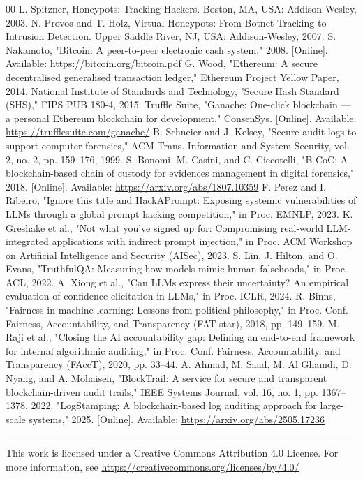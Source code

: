 \documentclass[journal,10pt,twocolumn]{IEEEtran}
\begin{document}

\begin{thebibliography}{00}
 L. Spitzner, Honeypots: Tracking Hackers. Boston, MA, USA: Addison-Wesley, 2003.
 N. Provos and T. Holz, Virtual Honeypots: From Botnet Tracking to Intrusion Detection. Upper Saddle River, NJ, USA: Addison-Wesley, 2007.
 S. Nakamoto, "Bitcoin: A peer-to-peer electronic cash system," 2008. [Online]. Available: \url{https://bitcoin.org/bitcoin.pdf}
 G. Wood, "Ethereum: A secure decentralised generalised transaction ledger," Ethereum Project Yellow Paper, 2014.
 National Institute of Standards and Technology, "Secure Hash Standard (SHS)," FIPS PUB 180-4, 2015.
 Truffle Suite, "Ganache: One-click blockchain --- a personal Ethereum blockchain for development," ConsenSys. [Online]. Available: \url{https://trufflesuite.com/ganache/}
 B. Schneier and J. Kelsey, "Secure audit logs to support computer forensics," ACM Trans. Information and System Security, vol. 2, no. 2, pp. 159--176, 1999.
 S. Bonomi, M. Casini, and C. Ciccotelli, "B-CoC: A blockchain-based chain of custody for evidences management in digital forensics," 2018. [Online]. Available: \url{https://arxiv.org/abs/1807.10359}
 F. Perez and I. Ribeiro, "Ignore this title and HackAPrompt: Exposing systemic vulnerabilities of LLMs through a global prompt hacking competition," in Proc. EMNLP, 2023.
 K. Greshake et al., "Not what you've signed up for: Compromising real-world LLM-integrated applications with indirect prompt injection," in Proc. ACM Workshop on Artificial Intelligence and Security (AISec), 2023.
 S. Lin, J. Hilton, and O. Evans, "TruthfulQA: Measuring how models mimic human falsehoods," in Proc. ACL, 2022.
 A. Xiong et al., "Can LLMs express their uncertainty? An empirical evaluation of confidence elicitation in LLMs," in Proc. ICLR, 2024.
 R. Binns, "Fairness in machine learning: Lessons from political philosophy," in Proc. Conf. Fairness, Accountability, and Transparency (FAT-star), 2018, pp. 149--159.
 M. Raji et al., "Closing the AI accountability gap: Defining an end-to-end framework for internal algorithmic auditing," in Proc. Conf. Fairness, Accountability, and Transparency (FAccT), 2020, pp. 33--44.
 A. Ahmad, M. Saad, M. Al Ghamdi, D. Nyang, and A. Mohaisen, "BlockTrail: A service for secure and transparent blockchain-driven audit trails," IEEE Systems Journal, vol. 16, no. 1, pp. 1367--1378, 2022.
 "LogStamping: A blockchain-based log auditing approach for large-scale systems," 2025. [Online]. Available: \url{https://arxiv.org/abs/2505.17236}
\end{thebibliography}

\vfill
\noindent\rule{0.48\textwidth}{0.4pt}\par
{\footnotesize This work is licensed under a Creative Commons Attribution
4.0 License. For more information, see
\url{https://creativecommons.org/licenses/by/4.0/}}
\end{document}
